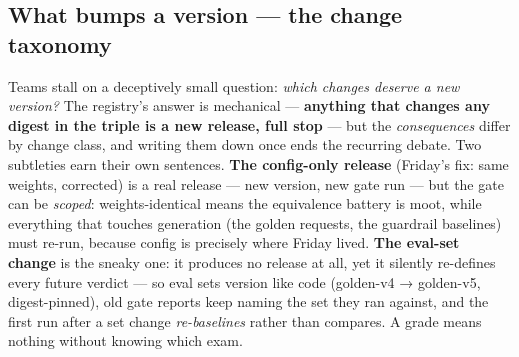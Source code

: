 \subsection*{What bumps a version — the change taxonomy}

Teams stall on a deceptively small question: \textit{which changes deserve a new version?} The registry's answer is mechanical — \textbf{anything that changes any digest in the triple is a new release, full stop} — but the \textit{consequences} differ by change class, and writing them down once ends the recurring debate. Two subtleties earn their own sentences. \textbf{The config-only release} (Friday's fix: same weights,  corrected) is a real release — new version, new gate run — but the gate can be \textit{scoped}: weights-identical means the equivalence battery is moot, while everything that touches generation (the golden requests, the guardrail baselines) must re-run, because config is precisely where Friday lived. \textbf{The eval-set change} is the sneaky one: it produces no release at all, yet it silently re-defines every future verdict — so eval sets version like code (golden-v4 → golden-v5, digest-pinned), old gate reports keep naming the set they ran against, and the first run after a set change \textit{re-baselines} rather than compares. A grade means nothing without knowing which exam.

